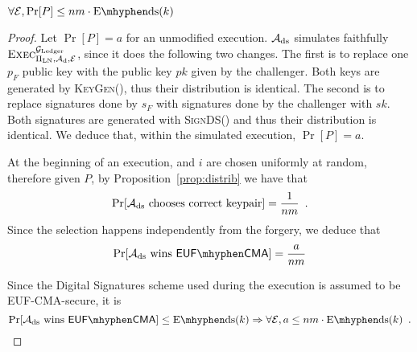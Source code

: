   \begin{proposition}
  \label{prop:forgery:ds}
    $\forall \environment, \Pr[P] \leq nm \cdot \mathrm{E \mhyphen ds}(k)$
  \end{proposition}

  \begin{proof}
    Let $\Pr[P] = a$ for an unmodified execution. $\mathcal{A}_{\mathrm{ds}}$
    simulates faithfully $\textsc{Exec}^{\mathcal{G}_{\mathrm{Ledger}}}_{\Pi_{\mathrm{LN}},
    \mathcal{A}_{\mathrm{d}}, \mathcal{E}}$, since it does the following two
    changes. The first is to replace one $p_F$ public key with the public key
    $pk$ given by the challenger. Both keys are generated by \textsc{KeyGen}(),
    thus their distribution is identical. The second is to replace signatures
    done by $s_F$ with signatures done by the challenger with $sk$. Both
    signatures are generated with \textsc{SignDS}() and thus their distribution
    is identical. We deduce that, within the simulated execution, $\Pr[P] = a$.

    At the beginning of an execution, \alice{} and $i$ are chosen uniformly at
    random, therefore given $P$, by Proposition~\ref{prop:distrib} we have that
    \begin{equation*}
      \Pr[\mathcal{A}_{\mathrm{ds}} \text{ chooses correct keypair}] =
      \frac{1}{nm} \enspace.
    \end{equation*}
    Since the selection happens independently from the forgery, we deduce that
    \begin{equation*}
      \Pr[\adversary_{\mathrm{ds}} \text{ wins } \mathsf{EUF \mhyphen CMA}] =
      \frac{a}{nm}
    \end{equation*}

    Since the Digital Signatures scheme used during the execution is assumed to
    be \textsf{EUF-CMA}-secure, it is
    \begin{equation*}
      \Pr[\adversary_{\mathrm{ds}} \text{ wins } \mathsf{EUF \mhyphen CMA}] \leq
      \mathrm{E \mhyphen ds}(k) \Rightarrow \forall \environment, a \leq nm
      \cdot \mathrm{E \mhyphen ds}(k) \enspace.
    \end{equation*}
  \end{proof}

